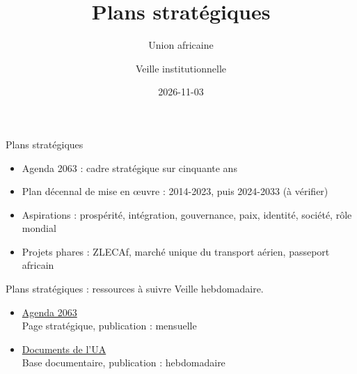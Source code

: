 \documentclass[aspectratio=169,11pt]{beamer}
\title{Plans stratégiques}
\subtitle{Union africaine}
\author{Veille institutionnelle}
\date{2026-11-03}
\begin{document}
\begin{frame}\titlepage\end{frame}

\begin{frame}{Plans stratégiques}
\begin{itemize}
\item Agenda 2063 : cadre stratégique sur cinquante ans
\item Plan décennal de mise en œuvre : 2014-2023, puis 2024-2033 (à vérifier)
\item Aspirations : prospérité, intégration, gouvernance, paix, identité, société, rôle mondial
\item Projets phares : ZLECAf, marché unique du transport aérien, passeport africain
\end{itemize}
\end{frame}

\begin{frame}{Plans stratégiques : ressources à suivre}
\small
Veille hebdomadaire.
\begin{itemize}
\item \href{https://au.int/en/agenda2063/overview}{Agenda 2063}\\{\footnotesize Page stratégique, publication : mensuelle}
\item \href{https://au.int/en/documents}{Documents de l'UA}\\{\footnotesize Base documentaire, publication : hebdomadaire}
\end{itemize}
\end{frame}
\end{document}
